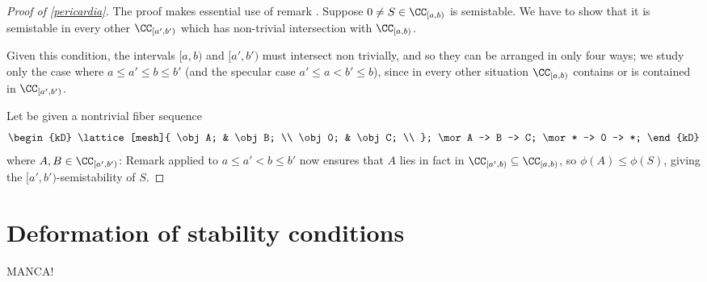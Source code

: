 \begin{proof}[Proof of \ref{pericardia}] The proof makes essential use of remark . Suppose $0\neq S\in\cab$ is semistable. We have to show that it is semistable in every other $\CC_{[a',b')}$ which has non\hyp{}trivial intersection with $\cab$.

Given this condition, the intervals $[a,b)$ and $[a', b')$ must intersect non trivially, and so they can be arranged in only four ways; we study only the case where $a \le a' \le b\le b'$ (and the specular case $a' \le a < b' \le b$), since in every other situation $\cab$ contains or is contained in $\CC_{[a',b')}$. 

Let be given a nontrivial fiber sequence 
\[
\begin{kD}
\lattice[mesh]{
  \obj A; & \obj B; \\
  \obj 0; & \obj C; \\
};
\mor A -> B -> C;
\mor * -> 0 -> *;
\end{kD}
\]
where $A,B\in\CC_{[a',b')}$: Remark  applied to $a\le a' < b \le b'$ now ensures that $A$ lies in fact in $\CC_{[a',b)}\subseteq \cab$, so $\phi(A)\le \phi(S)$, giving the $[a',b')$-semistability of $S$.
\end{proof}

\section{Deformation of stability conditions}
\epigraph{MANCA!}{}

